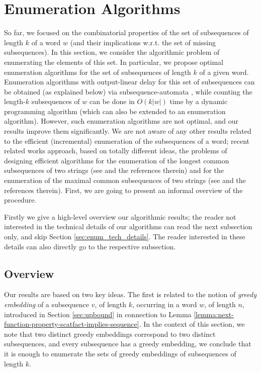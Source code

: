 \documentclass[10pt,a4paper]{amsart}
\theoremstyle{plain}
\theoremstyle{definition}
\begin{document}
	\section{Enumeration Algorithms}\label{sec:enum}
So far, we focused on the combinatorial properties of the set of subsequences of length $k$ of a word $w$ (and their implications w.r.t. the set of missing subsequences). In this section, we consider the algorithmic problem of enumerating the elements of this set. 
In particular, we propose optimal  enumeration algorithms for the set of subsequences of length $k$ of a given word. 
Enumeration algorithms with output-linear delay for this set of subsequences can be obtained (as explained below) via subsequence-automata \cite{CrochemoreMT03}, while counting the length-$k$ subsequences of $w$ can be done in $O(k|w|)$ time by a dynamic programming algorithm \cite{ELZINGA2008394} (which can also be extended to an enumeration algorithm). However, such enumeration algorithms are not optimal, and our results improve them significantly. We are not aware of any other results related to the efficient (incremental) enumeration of the subsequences of a word; recent related works approach, based on totally different ideas, the problems of designing efficient algorithms for the enumeration of the longest common subsequences of two strings (see \cite{Sakai25,Sakai25-2} and the references therein) and for the enumeration of the maximal common subsequences of two strings (see \cite{ConteGPU22,BuzzegaEtAl} and the references therein). %
First, we are going to present an informal overview of the procedure.

Firstly we give a high-level overview our algorithmic results; the reader not interested in the technical details of our algorithms can read the next subsection only, and skip Section \ref{sec:enum_tech_details}. The reader interested in these details can also directly go to the respective subsection.


\subsection{Overview}

Our results are based on two key ideas. The first is related to the notion of {\em greedy embedding} of a subsequence $v$, of length $k$, occurring in a word $w$, of length $n$, introduced in Section \ref{sec:upbound} in connection to Lemma \ref{lemma:next-function-property-scatfact-implies-sequence}. 
In the context of this section, we note that two distinct greedy embeddings correspond to two distinct subsequences, and every subsequence has a greedy embedding, we conclude that it is enough to enumerate the sets of greedy embeddings of subsequences of length $k$. 
\end{document}
